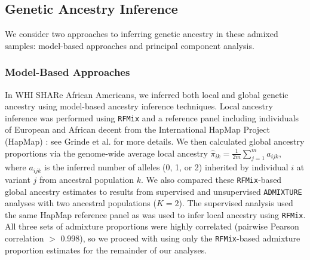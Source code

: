 \documentclass[12pt]{article}
\begin{document}
\subsection{Genetic Ancestry Inference}

We consider two approaches to inferring genetic ancestry in these admixed samples: model-based approaches and principal component analysis.

\subsubsection{Model-Based Approaches}

In WHI SHARe African Americans, we inferred both local and global genetic ancestry using model-based ancestry inference techniques. 
Local ancestry inference was performed using \texttt{RFMix} \citep{rfmix} and a reference panel including individuals of European and African decent from the International HapMap Project (HapMap) \citep{hapmap}: see Grinde et al. \cite{steam} for more details.
We then calculated global ancestry proportions via the genome-wide average local ancestry $\hat\pi_{ik} = \frac{1}{2m}\sum_{j=1}^m a_{ijk},$ where $a_{ijk}$ is the inferred number of alleles (0, 1, or 2) inherited by individual $i$ at variant $j$ from ancestral population $k$.
We also compared these \texttt{RFMix}-based global ancestry estimates to results from supervised and unsupervised \texttt{ADMIXTURE}  \citep{admixture} analyses with two ancestral populations ($K = 2$).
The supervised analysis used the same HapMap reference panel as was used to infer local ancestry using \texttt{RFMix}.
All three sets of admixture proportions were highly correlated (pairwise Pearson correlation $>$ 0.998), so we proceed with using only the \texttt{RFMix}-based admixture proportion estimates for the remainder of our analyses.
\end{document}
